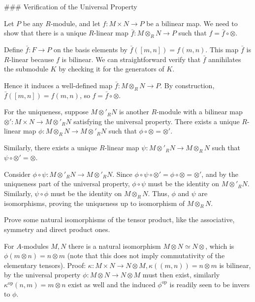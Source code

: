 ### Verification of the Universal Property

Let \( P \) be any \( R \)-module, and let \( f: M \times N \to P \) be a bilinear map. We need to show that there is a unique \( R \)-linear map \( \bar{f}: M \otimes_R N \to P \) such that \( f = \bar{f} \circ \otimes \).

Define \( \bar{f}: F \to P \) on the basis elements by \( \bar{f}([m, n]) = f(m, n) \). This map \( \bar{f} \) is \( R \)-linear because \( f \) is bilinear. We can straightforward verify that \( \bar{f} \) annihilates the submodule \( K \) by checking it for the generators of \( K \).

Hence it induces a well-defined map \( \bar{f}: M \otimes_R N \to P \). By construction, \( \bar{f}([m, n]) = f(m, n) \), so \( f = \bar{f} \circ \otimes \).

For the uniqueness,
suppose \( M \otimes'_R N \) is another \( R \)-module with a bilinear map \( \otimes': M \times N \to M \otimes'_R N \) satisfying the universal property. There exists a unique \( R \)-linear map \( \phi: M \otimes_R N \to M \otimes'_R N \) such that \( \phi \circ \otimes = \otimes' \).

Similarly, there exists a unique \( R \)-linear map \( \psi: M \otimes'_R N \to M \otimes_R N \) such that \( \psi \circ \otimes' = \otimes \).

Consider \( \phi \circ \psi: M \otimes'_R N \to M \otimes'_R N \). Since \( \phi \circ \psi \circ \otimes' = \phi \circ \otimes = \otimes' \), and by the uniqueness part of the universal property, \( \phi \circ \psi \) must be the identity on \( M \otimes'_R N \). Similarly, \( \psi \circ \phi \) must be the identity on \( M \otimes_R N \). Thus, \( \phi \) and \( \psi \) are isomorphisms, proving the uniqueness up to isomorphism of \( M \otimes_R N \).



Prove some natural isomorphisms of the tensor product, like the associative, symmetry and direct product ones. 

For \(A\)-modules \(M, N\) there is a natural isomorphism
\(M \otimes N \simeq N \otimes\), which is \(\phi(m \otimes n) = n \otimes m\) (note that this does not imply commutativity of the elementary tensors).
Proof:
\(\kappa : M \times N \to N \otimes M, \kappa((m, n)) = n \otimes m \) is bilinear, by the universal property \(\phi : M \otimes N \to N \otimes M\) must then exist, similarly \(\kappa^{\text{op}}(n, m) = m \otimes n\) exist as well and the induced \(\phi^{\text{op}}\) is readily seen to be invers to \(\phi\).

